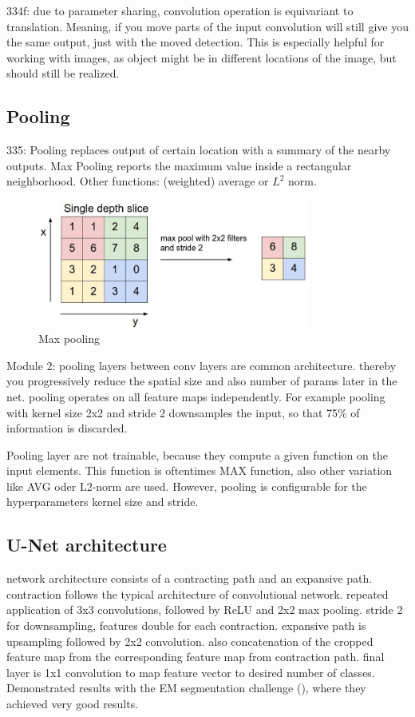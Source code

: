 334f: due to parameter sharing, convolution operation is equivariant to translation. Meaning, if you move parts of the input convolution will still give you the same output, just with the moved detection. This is especially helpful for working with images, as object might be in different locations of the image, but should still be realized.

\subsection{Pooling}
\cite{DLbook16}
335: Pooling replaces output of certain location with a summary of the nearby outputs. Max Pooling reports the maximum value inside a rectangular neighborhood. Other functions: (weighted) average or $L^2$ norm.


\begin{figure}[h]
    \centering
    \includegraphics[width=0.8\textwidth]{images/maxpool}
    \caption{Max pooling \cite{stanford_convnet}}
    \label{fig:pooling}
\end{figure}

\cite{stanford_convnet}
Module 2: pooling layers between conv layers are common architecture. thereby you progressively reduce the spatial size and also number of params later in the net. pooling operates on all feature maps independently. For example pooling with kernel size 2x2 and stride 2 downsamples the input, so that 75\% of information is discarded.

Pooling layer are not trainable, because they compute a given function on the input elements. This function is oftentimes MAX function, also other variation like AVG oder L2-norm are used. However, pooling is configurable for the hyperparameters kernel size and stride.

\subsection{U-Net architecture}
\cite{unet15}
network architecture consists of a contracting path and an expansive path. contraction follows the typical architecture of convolutional network. repeated application of 3x3 convolutions, followed by ReLU and 2x2 max pooling. stride 2 for downsampling, features double for each contraction.
expansive path is upsampling followed by 2x2 convolution. also concatenation of the cropped feature map from the corresponding feature map from contraction path.
final layer is 1x1 convolution to map feature vector to desired number of classes. Demonstrated results with the EM segmentation challenge (\cite{isbi_challenge}), where they achieved very good results.


\newpage